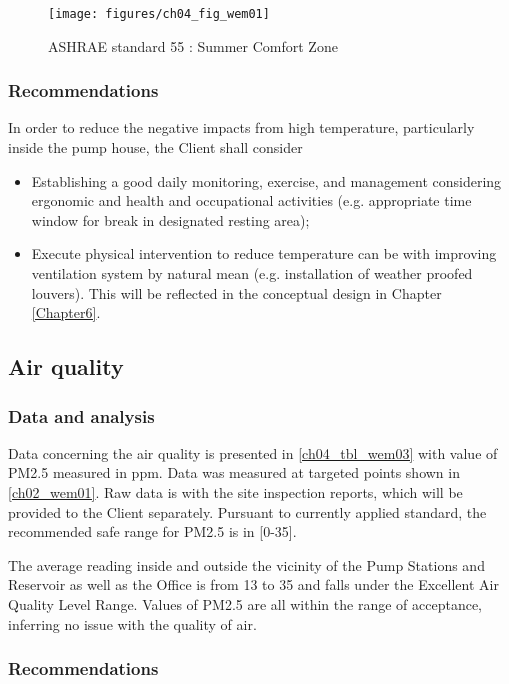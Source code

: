 \begin{figure}[!htb]
	\texttt{[image: figures/ch04\_fig\_wem01]} \\
	\caption{ASHRAE standard 55 : Summer Comfort Zone}
	\label{ch04_fig_wem01} 
\end{figure}

\subsubsection{Recommendations}
In order to reduce the negative impacts from high temperature, particularly inside the pump house, the Client shall consider

\begin{itemize}
	\item Establishing a good daily monitoring, exercise, and management considering ergonomic and health and occupational activities (e.g. appropriate time window for break in designated resting area);
	\item Execute physical intervention to reduce temperature can be with improving ventilation system by natural mean (e.g. installation of weather proofed louvers). This will be reflected in the conceptual design in Chapter \ref{Chapter6}.
\end{itemize}

\subsection{Air quality}\label{aq01}

\subsubsection{Data and analysis}
Data concerning the air quality is presented in \ref{ch04_tbl_wem03} with value of PM2.5 measured in ppm. Data was measured at targeted points shown in \ref{ch02_wem01}. Raw data is with the site inspection reports, which will be provided to the Client separately. Pursuant to currently applied standard, the recommended safe range for PM2.5 is in [0-35].



The average reading inside and outside the vicinity of the Pump Stations and Reservoir as well as the Office is from 13 to 35 and falls under the Excellent Air Quality Level Range. Values of PM2.5 are all within the range of acceptance, inferring no issue with the quality of air. 


\subsubsection{Recommendations}

